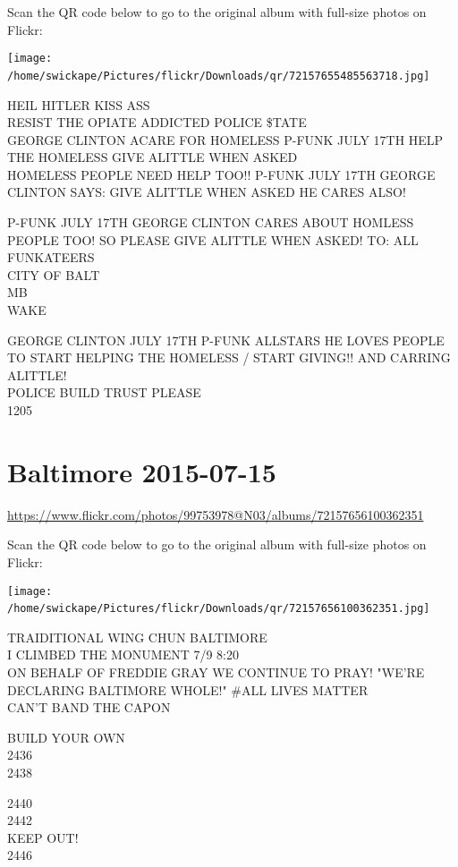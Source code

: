 \documentclass[10pt,letterpaper]{article}
\begin{document}
Scan the QR code below to go to the original album with full-size photos on Flickr:

\texttt{[image: /home/swickape/Pictures/flickr/Downloads/qr/72157655485563718.jpg]}
\

HEIL HITLER KISS ASS\\
RESIST THE OPIATE ADDICTED POLICE \$TATE\\
GEORGE CLINTON ACARE FOR HOMELESS P{-}FUNK JULY 17TH HELP THE HOMELESS GIVE ALITTLE WHEN ASKED\\
HOMELESS PEOPLE NEED HELP TOO!! P{-}FUNK JULY 17TH GEORGE CLINTON SAYS: GIVE ALITTLE WHEN ASKED HE CARES ALSO!

P{-}FUNK JULY 17TH GEORGE CLINTON CARES ABOUT HOMLESS PEOPLE TOO!  SO PLEASE GIVE ALITTLE WHEN ASKED!  TO: ALL FUNKATEERS\\
CITY OF BALT\\
MB\\
WAKE

GEORGE CLINTON JULY 17TH P{-}FUNK ALLSTARS HE LOVES PEOPLE TO START HELPING THE HOMELESS / START GIVING!! AND CARRING ALITTLE!\\
POLICE BUILD TRUST PLEASE\\
1205
\

\section*{Baltimore 2015-07-15}

\url{https://www.flickr.com/photos/99753978@N03/albums/72157656100362351}

Scan the QR code below to go to the original album with full-size photos on Flickr:

\texttt{[image: /home/swickape/Pictures/flickr/Downloads/qr/72157656100362351.jpg]}
\

TRAIDITIONAL WING CHUN BALTIMORE\\
I CLIMBED THE MONUMENT 7/9 8:20\\
ON BEHALF OF FREDDIE GRAY WE CONTINUE TO PRAY!  "WE'RE DECLARING BALTIMORE WHOLE!"  \#ALL LIVES MATTER\\
CAN'T BAND THE CAPON

BUILD YOUR OWN\\
2436\\
2438

2440\\
2442\\
KEEP OUT!\\
2446
\end{document}
